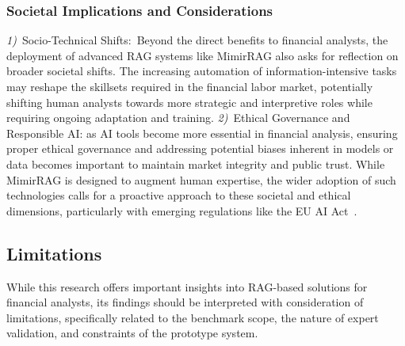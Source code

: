 \documentclass[final,5p,times,twopage,twocolumn,a4paper]{elsarticle}
\begin{document}
\subsubsection{Societal Implications and Considerations}
\textit{1)}~Socio-Technical Shifts:~Beyond the direct benefits to financial analysts, the deployment of advanced RAG systems like MimirRAG also asks for reflection on broader societal shifts. The increasing automation of information-intensive tasks may reshape the skillsets required in the financial labor market, potentially shifting human analysts towards more strategic and interpretive roles while requiring ongoing adaptation and training. \textit{2)}~Ethical Governance and Responsible AI: as AI tools become more essential in financial analysis, ensuring proper ethical governance and addressing potential biases inherent in models or data becomes important to maintain market integrity and public trust. While MimirRAG is designed to augment human expertise, the wider adoption of such technologies calls for a proactive approach to these societal and ethical dimensions, particularly with emerging regulations like the EU AI Act~\cite{europarl2023AIAct}.

\subsection{Limitations}
\label{sec:discussion:limitations}
While this research offers important insights into RAG-based solutions for financial analysts, its findings should be interpreted with consideration of limitations, specifically related to the benchmark scope, the nature of expert validation, and constraints of the prototype system.
\end{document}
